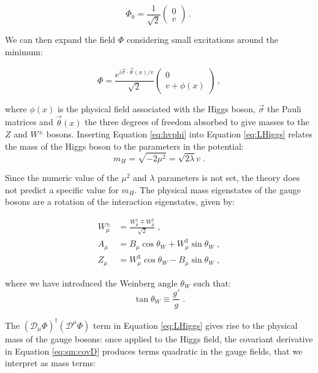 \begin{equation}
	\Phi_0 = \frac{1}{\sqrt{2}} \left( \begin{array}{c} 0 \\ v  \end{array} \right) \, . \
\label{eq:hvphi}
\end{equation}

We can then expand the field $\Phi$ considering small excitations around the minimum:

\begin{equation}
	\Phi = \frac{e^{i \vec{\sigma} \cdot \vec{\theta}(x)/v }}{\sqrt{2}} \left( \begin{array}{c} 0 \\ v + \phi(x) \end{array} \right) \, ,
\label{eq:hvphi}
\end{equation}

\noindent where $\phi(x)$ is the physical field associated with the Higgs boson, $\vec{\sigma}$ the Pauli matrices and $\vec{\theta}(x)$ the three degrees of freedom absorbed to give masses to the $Z$ and $W^\pm$ bosons. Inserting Equation \ref{eq:hvphi} into Equation \ref{eq:LHiggs} relates the mass of the Higgs boson to the parameters in the potential:
\begin{equation}
m_H = \sqrt{- 2 \mu^2} = \sqrt{2 \lambda} v \; .
\label{eq:sm:Higgsmass}
\end{equation}

Since the numeric value of the $\mu^2$ and $\lambda$ parameters is not set, the theory does not predict a specific value for $m_H$. 
The physical mass eigenstates of the gauge bosons are a rotation of the interaction eigenstates, given by:

\begin{equation}
\begin{aligned}
W_\mu^\pm &= \frac{W_\mu^1 \mp W_\mu^2}{\sqrt{2}} \; , \\
A_\mu &= B_\mu \cos\theta_W + W^3_\mu \sin\theta_W \; ,  \\
Z_\mu &= W^3_\mu \cos\theta_W - B_\mu \sin\theta_W \; ,
\end{aligned}
\label{eq:wein}
\end{equation}

\noindent where we have introduced the Weinberg angle $\theta_W$ such that:
\begin{equation}
\tan\theta_W \equiv \frac{g'}{g} \; .
\end{equation}


The $(\mathcal{D}_{\mu} \Phi)^{\dagger} (\mathcal{D}^{\mu} \Phi)$ term in Equation \ref{eq:LHiggs} gives rise to the physical mass of the gauge bosons: once applied to the Higgs field, the covariant derivative in Equation \ref{eq:sm:covD} produces terms quadratic in the gauge fields, that we interpret as mass terms:

